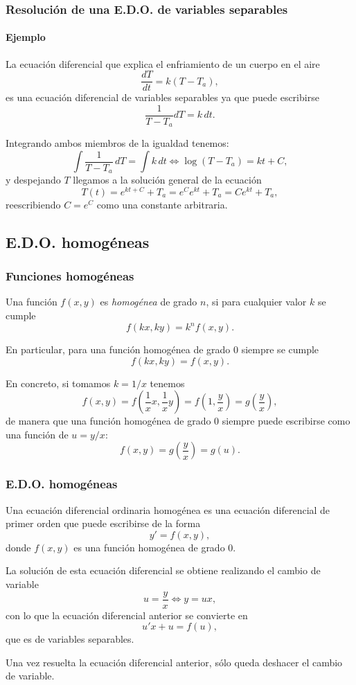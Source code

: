 \begin{frame}
	\frametitle{Resolución de una E.D.O. de variables separables}
	\framesubtitle{Ejemplo}
		
	La ecuación diferencial que explica el enfriamiento de un cuerpo en el aire 
	\[\frac{dT}{dt}=k(T-T_a),\]
	es una ecuación diferencial de variables separables ya que puede escribirse
	\[\frac{1}{T-T_a}dT=k\,dt.\]
		
	Integrando ambos miembros de la igualdad tenemos:
	\[
		\int \frac{1}{T-T_a}\,dT=\int k\,dt\Leftrightarrow \log(T-T_a)=kt+C,
	\]
	y despejando $T$ llegamos a la solución general de la ecuación
	\[
		T(t)=e^{kt+C}+T_a=e^Ce^{kt}+T_a=Ce^{kt}+T_a,
	\]
	reescribiendo $C=e^C$ como una constante arbitraria.
\end{frame}



\subsection{E.D.O. homogéneas}
\begin{frame}
	\frametitle{Funciones homogéneas}
	\begin{definicion}
		Una función $f(x,y)$ es \emph{homogénea} de grado $n$, si para cualquier valor $k$ se cumple
		\[f(kx,ky)= k^nf(x,y).\]
	\end{definicion}
		
	En particular, para una función homogénea de grado $0$ siempre se cumple  
	\[f(kx,ky)=f(x,y).\]
		
	En concreto, si tomamos $k=1/x$ tenemos
	\[
		f(x,y)=f\left(\frac{1}{x}x,\frac{1}{x}y\right)=f\left(1,\frac{y}{x}\right)=g\left(\frac{y}{x}\right),
	\]
	de manera que una función homogénea de grado $0$ siempre puede escribirse como una función de $u=y/x$:
	\[f(x,y)=g\left(\frac{y}{x}\right)=g(u).\]
\end{frame}


\begin{frame}
	\frametitle{E.D.O. homogéneas}
	\begin{definicion}[E.D.O. homogénea]
		Una ecuación diferencial ordinaria homogénea es una ecuación diferencial de primer orden que puede escribirse de la forma 
		\[y'=f(x,y),\]
		donde $f(x,y)$ es una función homogénea de grado $0$.
	\end{definicion}
		
	La solución de esta ecuación diferencial se obtiene realizando el cambio de variable
	\[
		u=\frac{y}{x}\Leftrightarrow y=ux,
	\]
	con lo que la ecuación diferencial anterior se convierte en 
	\[
		u'x+u=f(u),
	\]
	que es de variables separables.
		
	Una vez resuelta la ecuación diferencial anterior, sólo queda deshacer el cambio de variable.
\end{frame}


